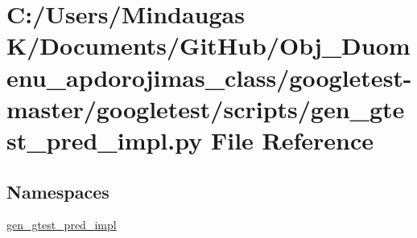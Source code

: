 \hypertarget{googletest-master_2googletest_2scripts_2gen__gtest__pred__impl_8py}{}\section{C\+:/\+Users/\+Mindaugas K/\+Documents/\+Git\+Hub/\+Obj\+\_\+\+Duomenu\+\_\+apdorojimas\+\_\+class/googletest-\/master/googletest/scripts/gen\+\_\+gtest\+\_\+pred\+\_\+impl.py File Reference}
\label{googletest-master_2googletest_2scripts_2gen__gtest__pred__impl_8py}
\subsection*{Namespaces}
\begin{DoxyCompactItemize}
\item 
 \mbox{\hyperlink{namespacegen__gtest__pred__impl}{gen\+\_\+gtest\+\_\+pred\+\_\+impl}}
\end{DoxyCompactItemize}
